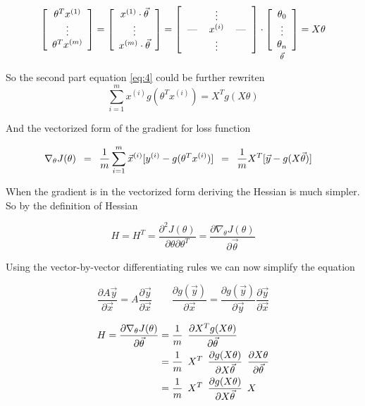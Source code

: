 \documentclass{article}
\begin{document}
\[
\left[
  \begin{array}{c}
	{\theta^T}x^{(1)} \\
	\vdots\\
	{\theta^T}x^{(m)}
  \end{array}
\right]
=
\left[
  \begin{array}{c}
	x^{(1)} \cdot {\vec{\theta}} \\
	\vdots\\
	x^{(m)} \cdot {\vec{\theta}} \\
  \end{array}
\right]
= 
\left[
  \begin{tabular}{c>{$}c<{$}c}
    & \vdots & \\
    --- & x^{(i)} & ---\\
    & \vdots & \\
  \end{tabular}
\right]
\cdot
\underset{\vec{\theta}}
{\left[
  \begin{array}{c}
	\theta_0 \\
	\vdots\\
	\theta_n
  \end{array}
\right]}
=X \theta
\]

So the second part equation \eqref{eq:4} could be further rewriten
\[
\sum_{i=1}^m   x^{(i)}  g({\theta^T}x^{(i)}) 
= 
X^Tg(X \theta)
\]

And the vectorized form of the gradient for loss function

\begin{align}
\nabla_{\theta} J(\theta) 
\enskip &= \enskip 
\frac1m \sum_{i=1}^m   \vec{x}^{(i)}[y^{(i)} -  g({\theta^T}x^{(i)})] 
\enskip = \enskip
\frac1m X^T[\vec{y} - g(X \vec \theta)]
\end{align}

When the gradient is in the vectorized form deriving the Hessian is much simpler. So by the definition of Hessian

\[
H = H^T = \frac{\partial^2J(\theta)}{\partial\theta\partial\theta^T}
=\frac{\partial\nabla_{\theta}J(\theta)}{\partial\vec{\theta}}
\]

Using the vector-by-vector differentiating rules we can now simplify the equation

\[
\frac{\partial A\vec y}{\partial \vec x} = A \frac{\partial \vec y}{\partial \vec x} \qquad
\frac{\partial g(\vec y)}{\partial \vec x} =  \frac{\partial g(\vec y)}{\partial \vec y}  \frac{\partial \vec y}{\partial \vec x}
\]

\begin{align}
	H = \frac{\partial\nabla_{\theta}J(\theta)}{\partial\vec{\theta}}
	&= \frac1m \enskip  \frac{\partial X^T g(X\theta)}{\partial\vec{\theta}} \\
	&= \frac1m \enskip  X^T \enskip \frac{\partial  g(X\theta)}{\partial X \vec{\theta}} \enskip  \frac{\partial X\theta}{\partial \vec{\theta}} \\
	& = \frac1m \enskip  X^T \enskip \frac{\partial  g(X\theta)}{\partial X \vec{\theta}} \enskip  X 
\end{align}
\end{document}
